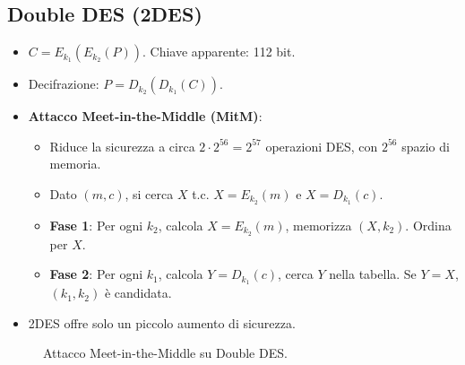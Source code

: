 \subsection{Double DES (2DES)}
\begin{itemize}
    \item $C = E_{k_1}(E_{k_2}(P))$. Chiave apparente: 112 bit.
    \item Decifrazione: $P = D_{k_2}(D_{k_1}(C))$.
    \item \textbf{Attacco Meet-in-the-Middle (MitM)}:
    \begin{itemize}
        \item Riduce la sicurezza a circa $2 \cdot 2^{56} = 2^{57}$ operazioni DES, con $2^{56}$ spazio di memoria.
        \item Dato $(m,c)$, si cerca $X$ t.c. $X = E_{k_2}(m)$ e $X = D_{k_1}(c)$.
        \item \textbf{Fase 1}: Per ogni $k_2$, calcola $X = E_{k_2}(m)$, memorizza $(X, k_2)$. Ordina per $X$.
        \item \textbf{Fase 2}: Per ogni $k_1$, calcola $Y = D_{k_1}(c)$, cerca $Y$ nella tabella. Se $Y=X$, $(k_1, k_2)$ è candidata.
    \end{itemize}
    \item 2DES offre solo un piccolo aumento di sicurezza.
\end{itemize}

\begin{figure}[H]
\centering
{}
\caption{Attacco Meet-in-the-Middle su Double DES.}
\end{figure}

